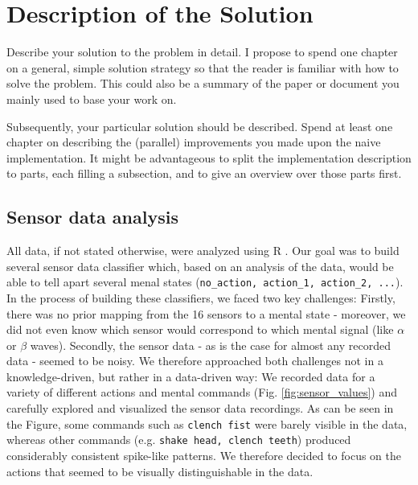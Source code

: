 \documentclass{utue} %
\begin{document}
\section{Description of the Solution}

Describe your solution to the problem in detail. I propose to spend one chapter on a general, simple solution strategy so that the reader is familiar with how to solve the problem. This could also be a summary of the paper or document you mainly used to base your work on.

Subsequently, your particular solution should be described. Spend at least one chapter on describing the (parallel) improvements you made upon the naive implementation. It might be advantageous to split the implementation description to parts, each filling a subsection, and to give an overview over those parts first.

\subsection{Sensor data analysis}
All data, if not stated otherwise, were analyzed using R \cite{RCoreTeam}. Our goal was to build several sensor data classifier which, based on an analysis of the data, would be able to tell apart several menal states (\texttt{no\_action, action\_1, action\_2, ...}). In the process of building these classifiers, we faced two key challenges: Firstly, there was no prior mapping from the 16 sensors to a mental state - moreover, we did not even know which sensor would correspond to which mental signal (like $ \alpha $ or $ \beta $ waves). Secondly, the sensor data - as is the case for almost any recorded data - seemed to be noisy. We therefore approached both challenges not in a knowledge-driven, but rather in a data-driven way: We recorded data for a variety of different actions and mental commands (Fig. \ref{fig:sensor_values}) and carefully explored and visualized the sensor data recordings. As can be seen in the Figure, some commands such as \texttt{clench fist} were barely visible in the data, whereas other commands (e.g. \texttt{shake head, clench teeth}) produced considerably consistent spike-like patterns. We therefore decided to focus on the actions that seemed to be visually distinguishable in the data.
\end{document}
